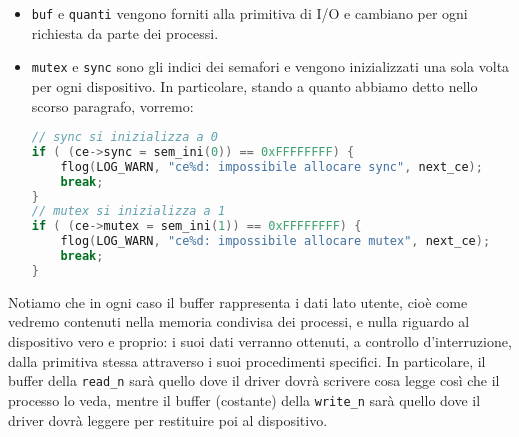\documentclass[a4paper,11pt]{article}
\begin{document}
\begin{itemize}
	\item \lstinline|buf| e \lstinline|quanti| vengono forniti alla primitiva di I/O e cambiano per ogni richiesta da parte dei processi.
	\item \lstinline|mutex| e \lstinline|sync| sono gli indici dei semafori e vengono inizializzati una sola volta per ogni dispositivo.
		In particolare, stando a quanto abbiamo detto nello scorso paragrafo, vorremo:
\begin{lstlisting}[language=C++, style=codestyle]	
// sync si inizializza a 0
if ( (ce->sync = sem_ini(0)) == 0xFFFFFFFF) { 
	flog(LOG_WARN, "ce%d: impossibile allocare sync", next_ce);
	break;
}
// mutex si inizializza a 1
if ( (ce->mutex = sem_ini(1)) == 0xFFFFFFFF) { 
	flog(LOG_WARN, "ce%d: impossibile allocare mutex", next_ce);
	break;
}
\end{lstlisting}
\end{itemize}

Notiamo che in ogni caso il buffer rappresenta i dati lato utente, cioè come vedremo contenuti nella memoria condivisa dei processi, e nulla riguardo al dispositivo vero e proprio: i suoi dati verranno ottenuti, a controllo d'interruzione, dalla primitiva stessa attraverso i suoi procedimenti specifici.
In particolare, il buffer della \lstinline|read_n| sarà quello dove il driver dovrà scrivere cosa legge così che il processo lo veda, mentre il buffer (costante) della \lstinline|write_n| sarà quello dove il driver dovrà leggere per restituire poi al dispositivo.
\end{document}

